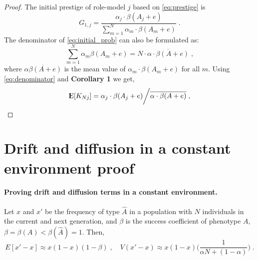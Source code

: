 \documentclass[12pt]{extarticle}
\DeclareMathOperator*{\E}{{\rm I\kern-.3em E}}
\begin{document}
\begin{proof}
The initial prestige of role-model $j$ based on \cref{eq:prestige} is
\begin{equation}\label{eq:initial_prob}
G_{1,j} = \frac{\alpha_j\cdot\beta(A_j+e)}{\sum\limits_{m=1}^{N} \alpha_m\cdot\beta(A_m+e)} \;.
\end{equation}
The denominator of \cref{eq:initial_prob} can also be formulated as:
\begin{equation}\label{eq:denominator}
 \sum\limits_{m=1}^{N}\alpha_m\beta(A_m+e) = N \cdot \overline{\alpha \cdot \beta(A+e)} \;,
\end{equation}
where $\overline{\alpha\beta(A+e)}$ is the mean value of $\alpha_m\cdot\beta(A_m+e)$ for all $m$.
Using \cref{eq:denominator} and \textbf{Corollary 1} we get,
\begin{equation}
\E[K_{Nj}] = \alpha_j \cdot \beta(A_j+e) \bigg/ \overline{\alpha \cdot \beta(A+e)} \;,
\end{equation}
\end{proof}

\section{Drift and diffusion in a constant environment proof}\label{append:drift_diff_const}

\paragraph{Proving drift and diffusion terms in a constant environment.}
Let $x$ and $x'$ be the frequency of type $\hat{A}$ in a population with $N$ individuals in the current and next generation, and  $\beta$ is the success coefficient of phenotype $A$, $\beta = \beta(A) < \beta(\hat{A}) = 1$.
Then,
\begin{equation*}
E[x'-x] \approx x(1-x)(1-\beta) \;, 
\quad
V(x'-x) \approx x(1-x)\Big(\frac{1}{\alpha N + (1-\alpha)}\Big) \;.
\end{equation*} 
\end{document}
